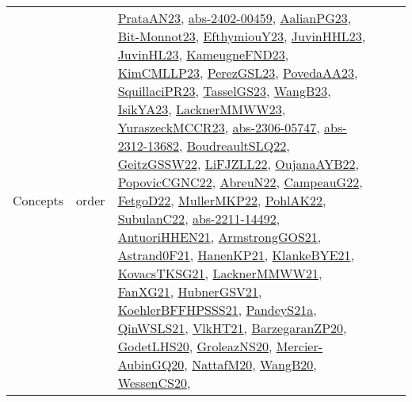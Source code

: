 {\begin{longtable}{lp{3cm}>{\raggedright}p{6cm}>{\raggedright}p{6cm}p{8cm}}
Concepts & order & \href{articles/PrataAN23.pdf}{PrataAN23}\cite{PrataAN23}, \href{articles/abs-2402-00459.pdf}{abs-2402-00459}\cite{abs-2402-00459}, \href{papers/AalianPG23.pdf}{AalianPG23}\cite{AalianPG23}, \href{papers/Bit-Monnot23.pdf}{Bit-Monnot23}\cite{Bit-Monnot23}, \href{papers/EfthymiouY23.pdf}{EfthymiouY23}\cite{EfthymiouY23}, \href{papers/JuvinHHL23.pdf}{JuvinHHL23}\cite{JuvinHHL23}, \href{papers/JuvinHL23.pdf}{JuvinHL23}\cite{JuvinHL23}, \href{papers/KameugneFND23.pdf}{KameugneFND23}\cite{KameugneFND23}, \href{papers/KimCMLLP23.pdf}{KimCMLLP23}\cite{KimCMLLP23}, \href{papers/PerezGSL23.pdf}{PerezGSL23}\cite{PerezGSL23}, \href{papers/PovedaAA23.pdf}{PovedaAA23}\cite{PovedaAA23}, \href{papers/SquillaciPR23.pdf}{SquillaciPR23}\cite{SquillaciPR23}, \href{papers/TasselGS23.pdf}{TasselGS23}\cite{TasselGS23}, \href{papers/WangB23.pdf}{WangB23}\cite{WangB23}, \href{articles/IsikYA23.pdf}{IsikYA23}\cite{IsikYA23}, \href{articles/LacknerMMWW23.pdf}{LacknerMMWW23}\cite{LacknerMMWW23}, \href{articles/YuraszeckMCCR23.pdf}{YuraszeckMCCR23}\cite{YuraszeckMCCR23}, \href{articles/abs-2306-05747.pdf}{abs-2306-05747}\cite{abs-2306-05747}, \href{articles/abs-2312-13682.pdf}{abs-2312-13682}\cite{abs-2312-13682}, \href{papers/BoudreaultSLQ22.pdf}{BoudreaultSLQ22}\cite{BoudreaultSLQ22}, \href{papers/GeitzGSSW22.pdf}{GeitzGSSW22}\cite{GeitzGSSW22}, \href{papers/LiFJZLL22.pdf}{LiFJZLL22}\cite{LiFJZLL22}, \href{papers/OujanaAYB22.pdf}{OujanaAYB22}\cite{OujanaAYB22}, \href{papers/PopovicCGNC22.pdf}{PopovicCGNC22}\cite{PopovicCGNC22}, \href{articles/AbreuN22.pdf}{AbreuN22}\cite{AbreuN22}, \href{articles/CampeauG22.pdf}{CampeauG22}\cite{CampeauG22}, \href{articles/FetgoD22.pdf}{FetgoD22}\cite{FetgoD22}, \href{articles/MullerMKP22.pdf}{MullerMKP22}\cite{MullerMKP22}, \href{articles/PohlAK22.pdf}{PohlAK22}\cite{PohlAK22}, \href{articles/SubulanC22.pdf}{SubulanC22}\cite{SubulanC22}, \href{articles/abs-2211-14492.pdf}{abs-2211-14492}\cite{abs-2211-14492}, \href{papers/AntuoriHHEN21.pdf}{AntuoriHHEN21}\cite{AntuoriHHEN21}, \href{papers/ArmstrongGOS21.pdf}{ArmstrongGOS21}\cite{ArmstrongGOS21}, \href{papers/Astrand0F21.pdf}{Astrand0F21}\cite{Astrand0F21}, \href{papers/HanenKP21.pdf}{HanenKP21}\cite{HanenKP21}, \href{papers/KlankeBYE21.pdf}{KlankeBYE21}\cite{KlankeBYE21}, \href{papers/KovacsTKSG21.pdf}{KovacsTKSG21}\cite{KovacsTKSG21}, \href{papers/LacknerMMWW21.pdf}{LacknerMMWW21}\cite{LacknerMMWW21}, \href{articles/FanXG21.pdf}{FanXG21}\cite{FanXG21}, \href{articles/HubnerGSV21.pdf}{HubnerGSV21}\cite{HubnerGSV21}, \href{articles/KoehlerBFFHPSSS21.pdf}{KoehlerBFFHPSSS21}\cite{KoehlerBFFHPSSS21}, \href{articles/PandeyS21a.pdf}{PandeyS21a}\cite{PandeyS21a}, \href{articles/QinWSLS21.pdf}{QinWSLS21}\cite{QinWSLS21}, \href{articles/VlkHT21.pdf}{VlkHT21}\cite{VlkHT21}, \href{papers/BarzegaranZP20.pdf}{BarzegaranZP20}\cite{BarzegaranZP20}, \href{papers/GodetLHS20.pdf}{GodetLHS20}\cite{GodetLHS20}, \href{papers/GroleazNS20.pdf}{GroleazNS20}\cite{GroleazNS20}, \href{papers/Mercier-AubinGQ20.pdf}{Mercier-AubinGQ20}\cite{Mercier-AubinGQ20}, \href{papers/NattafM20.pdf}{NattafM20}\cite{NattafM20}, \href{papers/WangB20.pdf}{WangB20}\cite{WangB20}, \href{papers/WessenCS20.pdf}{WessenCS20}\cite{WessenCS20}, 
\end{longtable}}
